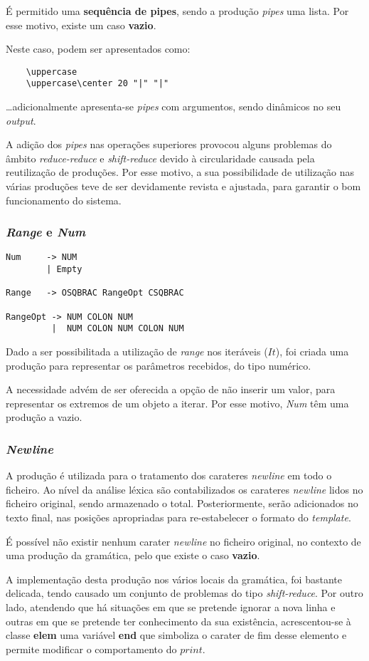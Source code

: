 \documentclass[../relatorio.tex]{subfiles}
\begin{document}
É permitido uma \textbf{sequência de pipes}, sendo a produção
\textit{pipes} uma lista.
Por esse motivo, existe um caso \textbf{vazio}.

Neste caso, podem ser apresentados como:
\begin{verbatim}
    \uppercase
    \uppercase\center 20 "|" "|"
\end{verbatim}
\dots adicionalmente apresenta-se \textit{pipes} com argumentos, sendo 
dinâmicos no seu \textit{output}.

A adição dos \textit{pipes} nas operações superiores provocou 
alguns problemas do âmbito \textit{reduce-reduce} e \textit{shift-reduce} devido à circularidade
causada pela reutilização de produções.
Por esse motivo, a sua possibilidade de utilização nas várias produções teve de ser 
devidamente revista e ajustada, para garantir o bom funcionamento do sistema.

\subsubsection{\textit{Range} e \textit{Num}} \label{grm:num}
\begin{verbatim}
Num     -> NUM
        | Empty

Range   -> OSQBRAC RangeOpt CSQBRAC

RangeOpt -> NUM COLON NUM
         |  NUM COLON NUM COLON NUM
\end{verbatim}
Dado a ser possibilitada a utilização de \textit{range} nos iteráveis ($It$),
foi criada uma produção para representar os parâmetros recebidos, do tipo numérico.

A necessidade advém de ser oferecida a opção de não inserir um valor, para representar
os extremos de um objeto a iterar.
Por esse motivo, \textit{Num} têm uma produção a vazio.

\subsubsection{\textit{Newline}} \label{grm:nl}
A produção é utilizada para o tratamento dos carateres \textit{newline}
em todo o ficheiro.
Ao nível da análise léxica são contabilizados os carateres \textit{newline}
lidos no ficheiro original, sendo armazenado o total.
Posteriormente, serão adicionados no texto final, nas 
posições apropriadas para re-estabelecer o formato do \textit{template}.

É possível não existir nenhum carater \textit{newline} no ficheiro original,
no contexto de uma produção da gramática, pelo que existe o caso \textbf{vazio}.

A implementação desta produção nos vários locais da gramática, foi 
bastante delicada, tendo causado um conjunto de problemas do tipo 
\textit{shift-reduce}.
Por outro lado, atendendo que há situações em que se pretende ignorar a nova linha
e outras em que se pretende ter conhecimento da sua existência, acrescentou-se à classe
\textbf{elem} uma variável \textbf{end} que simboliza o carater de fim desse elemento 
e permite modificar o comportamento do $print$.
\end{document}
